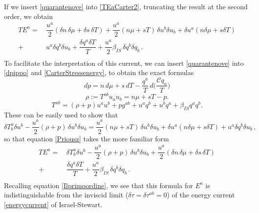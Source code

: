 \documentclass[a4paper, amsfonts, amssymb, amsmath, reprint, showkeys, nofootinbib, twoside, onecolumn,notitlepage]{revtex4-1}
\begin{document}
If we insert \eqref{quarantenove} into \eqref{TEaCarter2}, truncating the result at the second order, we obtain
\begin{equation}\label{Priousz}
\begin{split}
TE^a = \, & \dfrac{u^a}{2}(\delta n \, \delta \mu + \delta s \, \delta T) + \dfrac{u^a}{2} (n\mu + sT) \, \delta u^b \delta u_b + \delta u^a (n \delta \mu +s \delta T) \\
+ \, & u^a \delta q^b \delta u_b + \dfrac{\delta q^a \delta T}{T} + \dfrac{u^a}{2} \beta_{IS} \, \delta q^b \delta q_b \, .  \\
\end{split}
\end{equation}
To facilitate the interpretation of this current, we can insert \eqref{quarantenove} into \eqref{dpippo} and \eqref{CarterStressenergy}, to obtain the exact formulas 
\begin{equation}
dp = n \, d\mu +s \, dT - \dfrac{q^a}{T} \, d \bigg( \dfrac{\mathcal{C}q_a}{T} \bigg)
\end{equation}
\begin{equation}
\rho := T^{ab} u_a u_b = n\mu+sT-p.
\end{equation}
\begin{equation}
T^{ab} = (\rho+p)u^a u^b +p g^{ab}+ u^a q^b + u^b q^a + \beta_{IS} q^a q^b.
\end{equation}
These can be easily used to show that
\begin{equation}
\delta T^a_b \delta u^b -\dfrac{u^a}{2} (\rho + p) \, \delta u^b \delta u_b = \dfrac{u^a}{2} (n\mu +sT) \, \delta u^b \delta u_b + \delta u^a (n \delta \mu +s\delta T) + u^a \delta q^b \delta u_b \, , 
\end{equation}
so that equation \eqref{Priousz} takes the more familiar form
\begin{equation}
\begin{split}
TE^a = \, & \delta T^a_b \delta u^b -\dfrac{u^a}{2} (\rho + p) \, \delta u^b \delta u_b+ \dfrac{u^a}{2}(\delta n \, \delta \mu + \delta s \, \delta T) \\
+ \, & \dfrac{\delta q^a \delta T}{T} + \dfrac{u^a}{2} \beta_{IS} \, \delta q^b \delta q_b \, .  \\
\end{split}
\end{equation} 
Recalling equation \eqref{Ilprimoordine}, we see that this formula for $E^a$ is indistinguishable from the inviscid limit ($\delta \tau=\delta \tau^{ab}=0$) of the energy current \eqref{energycurrent} of Israel-Stewart.



\label{lastpage}
\end{document}

